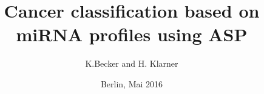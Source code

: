 \documentclass[10pt]{beamer}
\begin{document}
\title{Cancer classification based on miRNA profiles using ASP} 
\author{K.Becker and H. Klarner}
\date{Berlin, Mai 2016}



\frame{\titlepage}





\begin{frame}{}
\end{frame}
\end{document}
